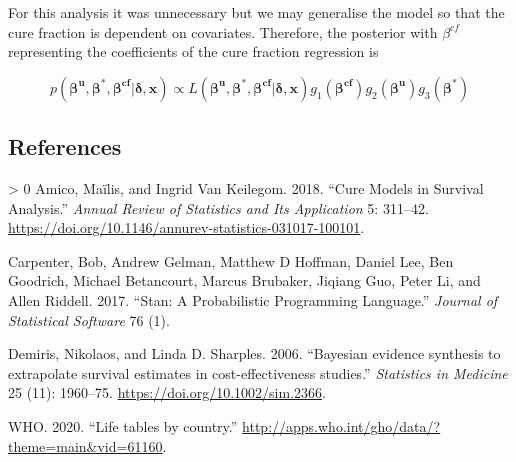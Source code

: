 \documentclass[
]{article}
\newlength{\cslhangindent}
\newenvironment{CSLReferences}[3] %
 {%
  \setlength{\parindent}{0pt}
  \ifodd #1 \everypar{\setlength{\hangindent}{\cslhangindent}}\ignorespaces\fi
  \ifnum #2 > 0
  \setlength{\parskip}{#2\baselineskip}
  \fi
 }%
 {}
\begin{document}
For this analysis it was unnecessary but we may generalise the model so
that the cure fraction is dependent on covariates. Therefore, the
posterior with \(\beta^{cf}\) representing the coefficients of the cure
fraction regression is

\[
p(\boldsymbol{\beta^u},\boldsymbol{\beta^*}, \boldsymbol{\beta^{cf}} | \boldsymbol{\delta}, \boldsymbol{x}) \propto L(\boldsymbol{\beta^u},\boldsymbol{\beta^*}, \boldsymbol{\beta^{cf}} | \boldsymbol{\delta}, \boldsymbol{x}) g_1(\boldsymbol{\beta^{cf}})  g_2(\boldsymbol{\beta^u}) g_3(\boldsymbol{\beta^*})
\]

\hypertarget{references}{%
\subsection*{References}\label{references}}

\hypertarget{refs}{}
\begin{CSLReferences}{1}{0}
\leavevmode\hypertarget{ref-Amico2018}{}%
Amico, Maïlis, and Ingrid Van Keilegom. 2018. {``{Cure Models in
Survival Analysis}.''} \emph{Annual Review of Statistics and Its
Application} 5: 311--42.
\url{https://doi.org/10.1146/annurev-statistics-031017-100101}.

\leavevmode\hypertarget{ref-carpenter2017stan}{}%
Carpenter, Bob, Andrew Gelman, Matthew D Hoffman, Daniel Lee, Ben
Goodrich, Michael Betancourt, Marcus Brubaker, Jiqiang Guo, Peter Li,
and Allen Riddell. 2017. {``Stan: A Probabilistic Programming
Language.''} \emph{Journal of Statistical Software} 76 (1).

\leavevmode\hypertarget{ref-Demiris2006}{}%
Demiris, Nikolaos, and Linda D. Sharples. 2006. {``{Bayesian evidence
synthesis to extrapolate survival estimates in cost-effectiveness
studies}.''} \emph{Statistics in Medicine} 25 (11): 1960--75.
\url{https://doi.org/10.1002/sim.2366}.

\leavevmode\hypertarget{ref-wholifetables}{}%
WHO. 2020. {``{Life tables by country}.''}
\url{http://apps.who.int/gho/data/?theme=main\&vid=61160}.

\end{CSLReferences}
\end{document}
